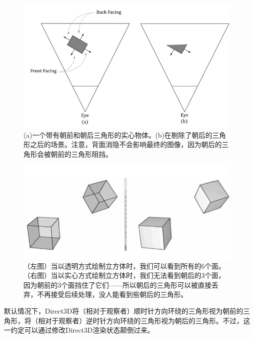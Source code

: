 \documentclass[11pt,a4paper,oldfontcommands]{memoir}
\begin{document}
{\begin{figure}[h]
    \includegraphics[width=\textwidth]{5-31}
    \centering
    \caption{(a)一个带有朝前和朝后三角形的实心物体。(b)在剔除了朝后的三角形之后的场景。注意，背面消隐不会影响最终的图像，因为朝后的三角形会被朝前的三角形阻挡。}
    \label{fig:5-31}
\end{figure}
\begin{figure}[h]
    \includegraphics[width=\textwidth]{5-32}
    \centering
    \caption{（左图）当以透明方式绘制立方体时，我们可以看到所有的6个面。（右图）当以实心方式绘制立方体时，我们无法看到朝后的3个面，因为朝前的3个面挡住了它们——所以朝后的三角形可以被直接丢弃，不再接受后续处理，没人能看到些朝后的三角形。}
    \label{fig:5-32}
\end{figure}
\begin{flushleft}
默认情况下，Direct3D将（相对于观察者）顺时针方向环绕的三角形视为朝前的三角形，将（相对于观察者）逆时针方向环绕的三角形视为朝后的三角形。不过，这一约定可以通过修改Direct3D渲染状态颠倒过来。
\end{flushleft}

}
\end{document}
